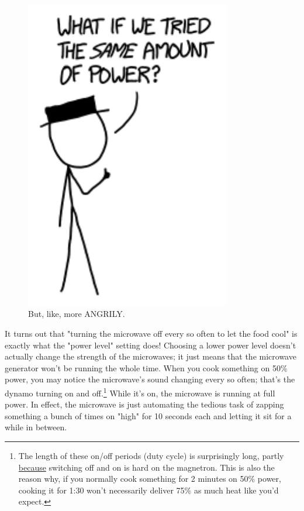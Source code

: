 {\begin{figure}[!htbp]
\centering
\includegraphics[scale=0.5, max width=0.8\textwidth]{imgs/a/131/same.png}
\caption{But, like, more ANGRILY.}
\end{figure}

{It turns out that "turning the microwave off every so often to let the food cool" is exactly what the "power level" setting does! Choosing a lower power level doesn't actually change the strength of the microwaves; it just means that the microwave generator won't be running the whole time. When you cook something on 50\% power, you may notice the microwave's sound changing every so often; that's the dynamo turning on and off.{\footnote{The length of these on/off periods (duty cycle) is surprisingly long, partly \href{http://www.microwaveresearch.com/microwave-selection.php}{because} switching off and on is hard on the magnetron. This is also the reason why, if you normally cook something for 2 minutes on 50\% power, cooking it for 1:30 won't necessarily deliver 75\% as much heat like you'd expect.} } While it's on, the microwave is running at full power. In effect, the microwave is just automating the tedious task of zapping something a bunch of times on "high" for 10 seconds each and letting it sit for a while in between.}

}
